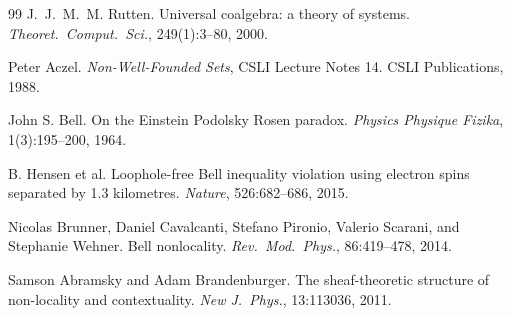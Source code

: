 \documentclass[11pt]{article}
\theoremstyle{definition}
\theoremstyle{plain}
\theoremstyle{remark}
\begin{document}
\begin{thebibliography}{99}
 J.~J.~M.~M. Rutten. Universal coalgebra: a theory of systems. \emph{Theoret.\
Comput.\ Sci.}, 249(1):3--80, 2000.

 Peter Aczel. \emph{Non-Well-Founded Sets}, CSLI Lecture Notes 14. CSLI Publications,
1988.

 John S. Bell. On the Einstein Podolsky Rosen paradox. \emph{Physics Physique
Fizika}, 1(3):195--200, 1964.

 B. Hensen et al. Loophole-free Bell inequality violation using electron spins
separated by 1.3 kilometres. \emph{Nature}, 526:682--686, 2015.

 Nicolas Brunner, Daniel Cavalcanti, Stefano Pironio, Valerio Scarani, and
Stephanie Wehner. Bell nonlocality. \emph{Rev.\ Mod.\ Phys.}, 86:419--478, 2014.

 Samson Abramsky and Adam Brandenburger. The sheaf-theoretic structure of
non-locality and contextuality. \emph{New J.\ Phys.}, 13:113036, 2011.

\end{thebibliography}
\end{document}
